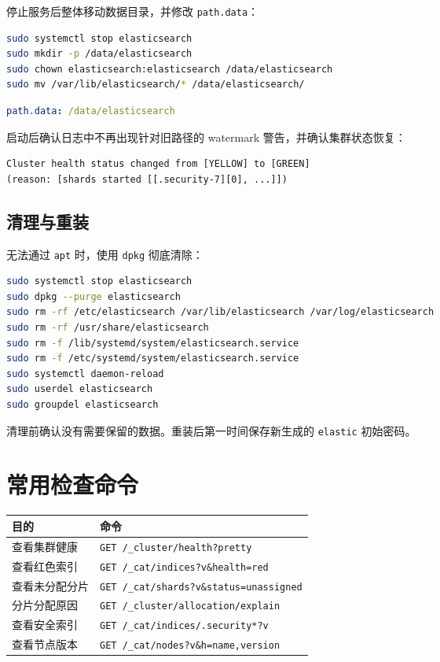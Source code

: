 \documentclass[11pt,a4paper,openany]{ctexbook}
\begin{document}
停止服务后整体移动数据目录，并修改 \texttt{path.data}：

\begin{lstlisting}[language=bash]
sudo systemctl stop elasticsearch
sudo mkdir -p /data/elasticsearch
sudo chown elasticsearch:elasticsearch /data/elasticsearch
sudo mv /var/lib/elasticsearch/* /data/elasticsearch/
\end{lstlisting}

\begin{lstlisting}[language=yaml]
path.data: /data/elasticsearch
\end{lstlisting}

启动后确认日志中不再出现针对旧路径的 watermark 警告，并确认集群状态恢复：

\begin{lstlisting}
Cluster health status changed from [YELLOW] to [GREEN]
(reason: [shards started [[.security-7][0], ...]])
\end{lstlisting}

\section{清理与重装}

无法通过 \texttt{apt} 时，使用 \texttt{dpkg} 彻底清除：

\begin{lstlisting}[language=bash]
sudo systemctl stop elasticsearch
sudo dpkg --purge elasticsearch
sudo rm -rf /etc/elasticsearch /var/lib/elasticsearch /var/log/elasticsearch
sudo rm -rf /usr/share/elasticsearch
sudo rm -f /lib/systemd/system/elasticsearch.service
sudo rm -f /etc/systemd/system/elasticsearch.service
sudo systemctl daemon-reload
sudo userdel elasticsearch
sudo groupdel elasticsearch
\end{lstlisting}

\begin{warn}
清理前确认没有需要保留的数据。重装后第一时间保存新生成的 \texttt{elastic} 初始密码。
\end{warn}

\chapter{常用检查命令}

\begin{center}
\begin{tabular}{@{}p{}p{}@{}}
\toprule
目的 & 命令 \\
\midrule
查看集群健康 & \texttt{GET /\_cluster/health?pretty} \\
查看红色索引 & \texttt{GET /\_cat/indices?v\&health=red} \\
查看未分配分片 & \texttt{GET /\_cat/shards?v\&status=unassigned} \\
分片分配原因 & \texttt{GET /\_cluster/allocation/explain} \\
查看安全索引 & \texttt{GET /\_cat/indices/.security*?v} \\
查看节点版本 & \texttt{GET /\_cat/nodes?v\&h=name,version} \\
\bottomrule
\end{tabular}
\end{center}
\end{document}
